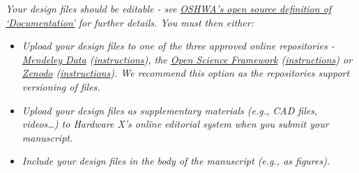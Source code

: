 \documentclass[11pt, letterpaper]{article}
\begin{document}
\textit{Your design files should be editable - see \href{https://www.oshwa.org/definition/}{OSHWA’s open source definition of ‘Documentation’} for further details. You must then either:}
\begin{itemize}
\item[$\bullet$]{\it Upload your design files to one of the three approved online repositories - \href{https://data.mendeley.com/}{Mendeley Data} (\href{https://doi.org/10.5281/zenodo.3346799}{instructions}), the \href{https://osf.io/}{Open Science Framework} (\href{https://osf.io/wgk7q/wiki/home/}{instructions}) or \href{https://zenodo.org/}{Zenodo} (\href{https://doi.org/10.5281/zenodo.3346799}{instructions}). We recommend this option as the repositories support versioning of files.}
\item[$\bullet$]{\it Upload your design files as supplementary materials (e.g., CAD files, videos…) to Hardware X’s online editorial system when you submit your manuscript.}
\item[$\bullet$]{\it Include your design files in the body of the manuscript (e.g., as figures).}
\end{itemize}
\end{document}
